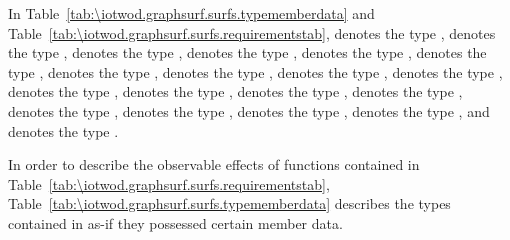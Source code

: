 \pnum
In Table~\ref{tab:\iotwod.graphsurf.surfs.typememberdata} and Table~\ref{tab:\iotwod.graphsurf.surfs.requirementstab},
 denotes the type ,
 denotes the type ,
 denotes the type ,  denotes the type ,
 denotes the type ,
 denotes the type ,
 denotes the type ,
 denotes the type ,
 denotes the type ,
 denotes the type ,
 denotes the type ,
 denotes the type ,
 denotes the type ,
 denotes the type ,
 denotes the type ,
 denotes the type ,
 denotes the type ,
 denotes the type , and
 denotes the type .

\pnum
In order to describe the observable effects of functions contained in Table~\ref{tab:\iotwod.graphsurf.surfs.requirementstab}, Table~\ref{tab:\iotwod.graphsurf.surfs.typememberdata} describes the types contained in  as-if they possessed certain member data. 

